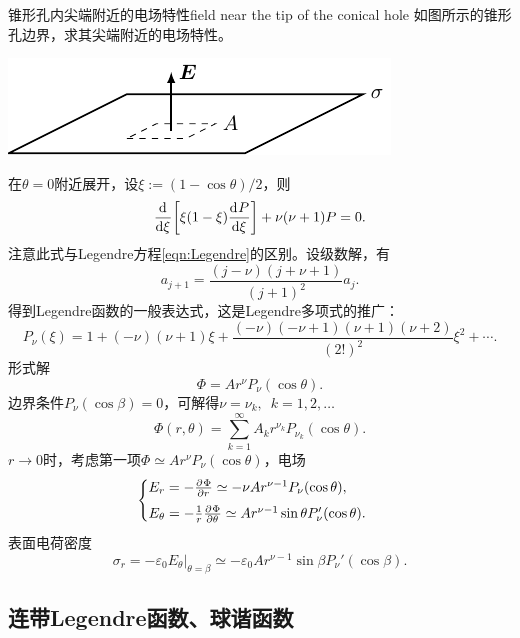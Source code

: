 \begin{example}{锥形孔内尖端附近的电场特性}{field near the tip of the conical hole}
    如图所示的锥形孔边界，求其尖端附近的电场特性。
    \begin{center}
        \includegraphics[page=14]{figures/tikz/layouts.pdf}
    \end{center}
    在$\theta=0$附近展开，设$\xi:=(1-\cos\theta)/2$，则 
    \[
        \frac{\mathrm{d}^{{}}}{\mathrm{d}{\xi}^{{}}}\biggl[\xi(1-\xi)\frac{\mathrm{d}^{{}}P}{\mathrm{d}{\xi}^{{}}}\biggr]+\nu(\nu+1)P=0.
    \]
    注意此式与Legendre方程\eqref{eqn:Legendre}的区别。设级数解，有
    \[
        a_{j+1}=\frac{(j-\nu)(j+\nu+1)}{(j+1)^2}a_j.
    \]
    得到Legendre函数的一般表达式，这是Legendre多项式的推广：
    \[
        P_\nu(\xi)=1+(-\nu)(\nu+1)\xi+\frac{(-\nu)(-\nu+1)(\nu+1)(\nu+2)}{(2!)^2}\xi^2+\cdots.
    \]
    形式解
    \[
        \Phi=Ar^\nu P_\nu(\cos\theta).
    \]
    边界条件$P_\nu(\cos\beta)=0$，可解得$\nu=\nu_k,\enspace k=1,2,\ldots$
    \[
        \Phi(r,\theta)=\sum_{k=1}^\infty A_kr^{\nu_k}P_{\nu_k}(\cos\theta).
    \]
    $r\to 0$时，考虑第一项$\Phi\simeq Ar^\nu P_\nu(\cos\theta)$，电场
    \[
        \begin{cases}
            E_r=-\frac{\partial^{{}}\Phi}{\partial{r}^{{}}}\simeq-\nu Ar^{\nu-1}P_\nu(\cos\theta),\\[1ex]
            E_\theta=-\frac1r\frac{\partial^{{}}\Phi}{\partial{\theta}^{{}}}\simeq Ar^{\nu-1}\sin\theta P'_\nu(\cos\theta).
        \end{cases}
    \]
    表面电荷密度
    \[
        \sigma_r=-\varepsilon_0E_\theta|_{\theta=\beta}\simeq-\varepsilon_0Ar^{\nu-1}\sin\beta P_\nu'(\cos\beta).
    \]
\end{example}

\subsection{连带Legendre函数、球谐函数}
\label{ssec:associated Legendre function and spherical harmonics}

